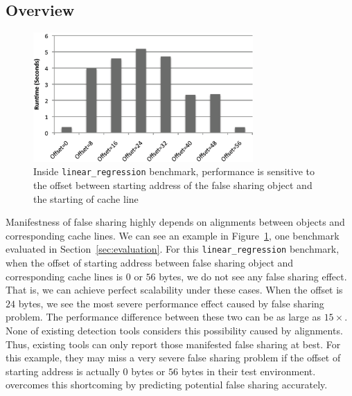 \label{sec:prediction}

\subsection{Overview}
\label{sec:predictoverview}

\begin{figure}[!h]
\begin{center}
\includegraphics[width=3.3in]{fig/perfsensitive}
\end{center}
\caption{
Inside \texttt{linear\_regression} benchmark,
performance is sensitive to the offset between starting address of the false sharing object 
and the starting of cache line 
\label{fig:perfsensitive}}
\end{figure}

Manifestness of false sharing highly depends on 
alignments between objects and corresponding cache lines.
We can see an example in Figure~\ref{fig:perfsensitive}, one benchmark evaluated in
Section~\ref{sec:evaluation}. 
For this \texttt{linear\_regression} benchmark,
when the offset of starting address between false sharing object and corresponding cache lines 
is $0$ or $56$ bytes, 
we do not see any false sharing effect. That is, we can achieve perfect scalability under
these cases.  
When the offset is $24$ bytes, we see the most severe performance effect caused 
by false sharing problem. 
The performance difference between these two can be as large as $15\times$.
None of existing detection tools considers this possibility caused by alignments. 
Thus, existing tools can only report those manifested false sharing at best. 
For this example, they may miss a very severe false sharing problem if the offset of starting 
address is actually $0$ bytes or $56$ bytes in their test environment.
 overcomes this shortcoming by predicting potential false sharing accurately. 

